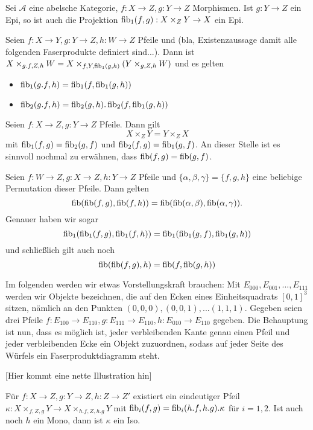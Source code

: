 \begin{prop} Sei $\mathcal A$ eine abelsche Kategorie, $f : X \to Z, g : Y\to Z$ Morphismen. Ist $g: Y\to Z$ ein Epi, so ist auch die Projektion $\operatorname{fib}_1(f,g): X\times_Z Y \to X$ ein Epi.
\end{prop}

\begin{satz}[Staffelung]
Seien $f: X\to Y,g : Y\to Z,h:W\to Z$ Pfeile und (bla, Existenzaussage damit alle folgenden Faserprodukte definiert sind...). Dann ist $X\times_{g.f,Z,h} W = X\times_{f,Y,\operatorname{fib}_1(g,h)} (Y\times_{g,Z,h} W)$ und es gelten
\begin{itemize}
\item $\operatorname{fib}_1(g.f,h) = \operatorname{fib}_1(f,\operatorname{fib}_1(g,h))$
\item $\operatorname{fib}_2(g.f,h) = \operatorname{fib}_2(g,h) . \operatorname{fib}_2(f,\operatorname{fib}_1(g,h))$
\end{itemize}
\end{satz}

\begin{prop}[Kommutativität]
Seien $f : X\to Z, g:Y\to Z$ Pfeile. Dann gilt
\[ X\times_Z Y = Y\times_Z X \]
mit $\operatorname{fib}_1(f,g) = \operatorname{fib}_2(g,f)$ und $\operatorname{fib}_2(f,g) = \operatorname{fib}_1(g,f)$.
An dieser Stelle ist es sinnvoll nochmal zu erwähnen, dass $\operatorname{fib}(f,g) = \operatorname{fib}(g,f)$.
\end{prop}

\begin{prop}[Assoziativität]
Seien $f : W \to Z, g: X \to Z, h : Y\to Z$ Pfeile und $\{ \alpha, \beta, \gamma \} = \{ f,g,h\}$ eine beliebige Permutation dieser Pfeile. Dann gelten
\[ \operatorname{fib}(\operatorname{fib}(f,g),\operatorname{fib}(f,h)) = \operatorname{fib}(\operatorname{fib}(\alpha,\beta),\operatorname{fib}(\alpha,\gamma)). \]
Genauer haben wir sogar
\[ \operatorname{fib}_1(\operatorname{fib}_1(f,g),\operatorname{fib}_1(f,h)) = \operatorname{fib}_1(\operatorname{fib}_1(g,f),\operatorname{fib}_1(g,h)) \]
und schließlich gilt auch noch
\[ \operatorname{fib}(\operatorname{fib}(f,g),h) = \operatorname{fib}(f,\operatorname{fib}(g,h)) \]
\end{prop}

\begin{korr}[Faserproduktwürfel]
Im folgenden werden wir etwas Vorstellungskraft brauchen: Mit $E_{000},E_{001},...,E_{111}$ werden wir Objekte bezeichnen, die auf den Ecken eines Einheitsquadrats $[0,1]^3$ sitzen, nämlich an den Punkten $(0,0,0),(0,0,1),...(1,1,1)$.
Gegeben seien drei Pfeile $f : E_{100} \to E_{110}, g : E_{111} \to E_{110}, h : E_{010} \to E_{110}$ gegeben. Die Behauptung ist nun, dass es möglich ist, jeder verbleibenden Kante genau einen Pfeil und jeder verbleibenden Ecke ein Objekt zuzuordnen, sodass auf jeder Seite des Würfels ein Faserproduktdiagramm steht.

[Hier kommt eine nette Illustration hin]
\end{korr}

\begin{prop}
Für $f: X\to Z, g:Y\to Z, h:Z\to Z'$ existiert ein eindeutiger Pfeil $\kappa : X\times_{f,Z,g} Y \to X\times_{h.f,Z,h.g} Y$ mit $\operatorname{fib}_i(f,g) = \operatorname{fib}_i(h.f,h.g).\kappa$ für $i=1,2$. Ist auch noch $h$ ein Mono, dann ist $\kappa$ ein Iso.
\end{prop}

